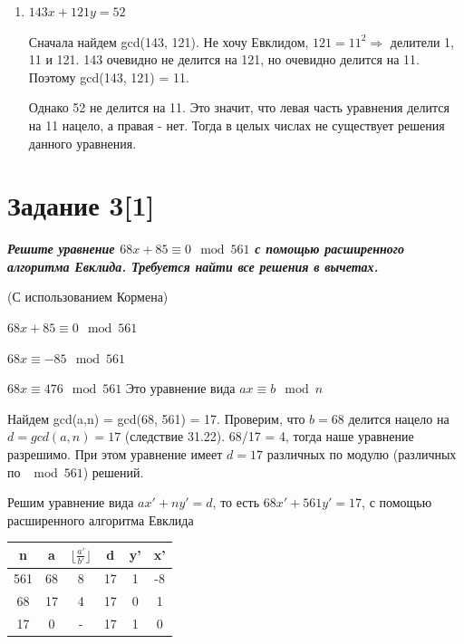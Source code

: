 \documentclass{article}
\begin{document}
\begin{enumerate}
Тогда, в нашем конкретном случае,

\[
\begin{cases} 
x = -399 + \frac{385}{7} t = -399 + 55t \\ 
y = 247 - \frac{247}{7} t = 247 - 34t \\ 
t \in \mathbb{Z}
\end{cases}
\]


\medskip


    \item $143x + 121y = 52$

Сначала найдем  gcd(143, 121). Не хочу Евклидом, $121 = 11^2 \Rightarrow$ делители 1, 11 и 121. 143 очевидно не делится на 121, но очевидно делится на 11. Поэтому  gcd(143, 121) = 11.

Однако 52 не делится на 11. Это значит, что левая часть уравнения делится на 11 нацело, а правая - нет. Тогда в целых числах не существует решения данного уравнения.
    
\end{enumerate}

\bigskip



\section*{\textbf{Задание 3[1]}} \textbf{\textit{Решите уравнение $68x + 85 \equiv 0 \mod 561$ с помощью расширенного алгоритма Евклида. Требуется найти все решения в вычетах.}}

(С использованием Кормена)

$68x + 85 \equiv 0 \mod 561$

$68x \equiv -85 \mod 561$

$68x \equiv 476 \mod 561$
Это уравнение вида $ax \equiv b \mod n$

Найдем  gcd(a,n) =  gcd(68, 561) = 17. Проверим, что $b = 68$ делится нацело на $d =  gcd(a,n) = 17$ (следствие 31.22). 68/17 = 4, тогда наше уравнение разрешимо. При этом уравнение имеет $d = 17$ различных по модулю (различных по $\mod 561$) решений. 

Решим уравнение вида $ax' + ny' = d$, то есть $68x' + 561y' = 17$, с помощью расширенного алгоритма Евклида


\begin{center}
\begin{tabular}{ |c|c|c|c|c|c| } 
\hline
n & a & $\lfloor \frac{a'}{b'} \rfloor$ & d &y' & x'  \\
\hline
561 & 68 & 8 & 17 & 1 &  -8 \\ 
68 & 17 & 4 & 17 & 0 & 1 \\ 
17 & 0 & - & 17 & 1 & 0 \\ 
\hline
\end{tabular}
\end{center}
\end{document}
